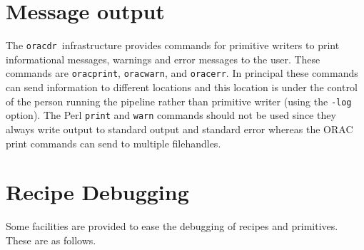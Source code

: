 \documentclass[twoside,11pt]{article}
\renewcommand{\_}{\texttt{\symbol{95}}}
\newcommand{\oracdr}{\texttt{oracdr}}
\begin{document}
\section{Message output}

The \oracdr\ infrastructure provides commands for primitive writers
to print informational messages, warnings and error messages to the
user. These commands are \texttt{orac\_print}, \texttt{orac\_warn},
and \texttt{orac\_err}. In principal these commands can send
information to different locations and this location is under the control of
the person running the pipeline rather than primitive writer (using
the \texttt{-log} option). The Perl \texttt{print} and \texttt{warn}
commands should not be used since they always write output to standard 
output and standard error whereas the ORAC print commands can send to
multiple filehandles.

\section{Recipe Debugging}

Some facilities are provided to ease the debugging of recipes and
primitives. These are as follows.
\end{document}
